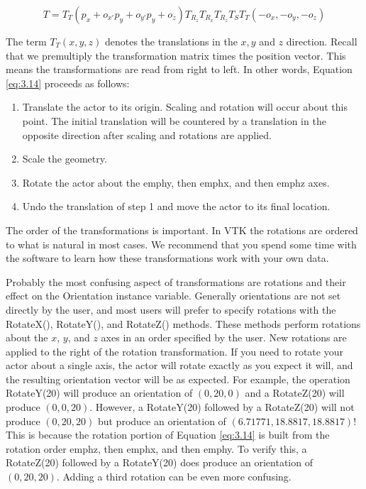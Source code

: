 \begin{equation}\label{eq:3.14}
T = T_T(p_x + o_{x'}p_y + o_{y'}p_y + o_z)T_{R_z}T_{R_x}T_{R_z}T_ST_T(-o_x,-o_y,-o_z)
\end{equation}

The term $T_T(x, y, z)$ denotes the translations in the $x,y$ and $z$ direction. Recall that we premultiply the transformation matrix times the position vector. This means the transformations are read from right to left. In other words, Equation \eqref{eq:3.14} proceeds as follows:

\begin{enumerate}
\item Translate the actor to its origin. Scaling and rotation will occur about this point. The initial translation will be countered by a translation in the opposite direction after scaling and rotations are applied.

\item Scale the geometry.

\item Rotate the actor about the emph{y}, then emph{x}, and then emph{z} axes.

\item Undo the translation of step 1 and move the actor to its final location.
\end{enumerate}

The order of the transformations is important. In VTK the rotations are ordered to what is natural in most cases. We recommend that you spend some time with the software to learn how these transformations work with your own data.

Probably the most confusing aspect of transformations are rotations and their effect on the Orientation instance variable. Generally orientations are not set directly by the user, and most users will prefer to specify rotations with the RotateX(), RotateY(), and RotateZ() methods. These methods perform rotations about the $x$, $y$, and $z$ axes in an order specified by the user. New rotations are applied to the right of the rotation transformation. If you need to rotate your actor about a single axis, the actor will rotate exactly as you expect it will, and the resulting orientation vector will be as expected. For example, the operation RotateY(20) will produce an orientation of $(0,20,0)$ and a RotateZ(20) will produce $(0,0,20)$. However, a RotateY(20) followed by a RotateZ(20) will not produce $(0,20,20)$ but produce an orientation of $(6.71771, 18.8817, 18.8817)$! This is because the rotation portion of Equation \eqref{eq:3.14} is built from the rotation order emph{z}, then emph{x}, and then emph{y}. To verify this, a RotateZ(20) followed by a RotateY(20) does produce an orientation of $(0,20,20)$. Adding a third rotation can be even more confusing.

